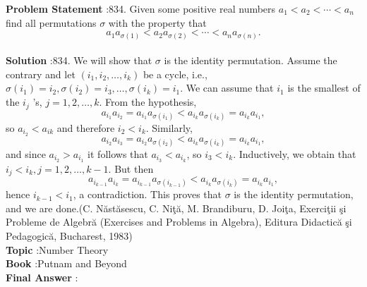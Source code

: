 \documentclass[10pt]{article}
\begin{document}
\textbf{Problem Statement} :834. Given some positive real numbers $a_{1}<a_{2}<\cdots<a_{n}$ find all permutations $\sigma$ with the property that$$ a_{1} a_{\sigma(1)}<a_{2} a_{\sigma(2)}<\cdots<a_{n} a_{\sigma(n)} . $$\\
\textbf{Solution} :834. We will show that $\sigma$ is the identity permutation. Assume the contrary and let $\left(i_{1}, i_{2}, \ldots, i_{k}\right)$ be a cycle, i.e., $\sigma\left(i_{1}\right)=i_{2}, \sigma\left(i_{2}\right)=i_{3}, \ldots, \sigma\left(i_{k}\right)=i_{1}$. We can assume that $i_{1}$ is the smallest of the $i_{j}$ 's, $j=1,2, \ldots, k$. From the hypothesis,$$ a_{i_{1}} a_{i_{2}}=a_{i_{1}} a_{\sigma\left(i_{1}\right)}<a_{i_{k}} a_{\sigma\left(i_{k}\right)}=a_{i_{k}} a_{i_{1}}, $$so $a_{i_{2}}<a_{i k}$ and therefore $i_{2}<i_{k}$. Similarly,$$ a_{i_{2}} a_{i_{3}}=a_{i_{2}} a_{\sigma\left(i_{2}\right)}<a_{i_{k}} a_{\sigma\left(i_{k}\right)}=a_{i_{k}} a_{i_{1}}, $$and since $a_{i_{2}}>a_{i_{1}}$ it follows that $a_{i_{3}}<a_{i_{k}}$, so $i_{3}<i_{k}$. Inductively, we obtain that $i_{j}<i_{k}, j=1,2, \ldots, k-1$. But then$$ a_{i_{k-1}} a_{i_{k}}=a_{i_{k-1}} a_{\sigma\left(i_{k-1}\right)}<a_{i_{k}} a_{\sigma\left(i_{k}\right)}=a_{i_{k}} a_{i_{1}}, $$hence $i_{k-1}<i_{1}$, a contradiction. This proves that $\sigma$ is the identity permutation, and we are done.(C. Năstăsescu, C. Niţă, M. Brandiburu, D. Joiţa, Exerciţii şi Probleme de Algebră (Exercises and Problems in Algebra), Editura Didactică şi Pedagogică, Bucharest, 1983)\\
\textbf{Topic} :Number Theory\\
\textbf{Book} :Putnam and Beyond\\
\textbf{Final Answer} :\\
\end{document}
